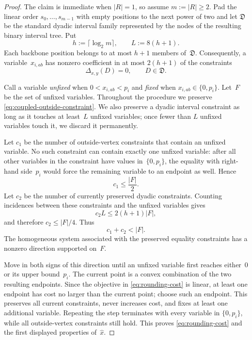 \documentclass[12pt,a4paper,oneside]{report}
\begin{document}
\begin{proof}
The claim is immediate when $|R|=1$, so assume $m:=|R|\ge2$.  Pad the linear
order $s_0,\ldots,s_{m-1}$ with empty positions to the next power of two and
let $\mathfrak D$ be the standard dyadic interval family represented by the
nodes of the resulting binary interval tree.  Put
\[
    h:=\lceil\log_2 m\rceil,
    \qquad
    L:=8(h+1).
\]
Each backbone position belongs to at most $h+1$ members of~$\mathfrak D$.
Consequently, a variable~$x_{i,ab}$ has nonzero coefficient in at most
$2(h+1)$ of the constraints
\[
    \Delta_{x,y}(D)=0,
    \qquad D\in\mathfrak D.
\]

Call a variable \emph{unfixed} when $0<x_{i,ab}<p_i$ and \emph{fixed} when
$x_{i,ab}\in\{0,p_i\}$.  Let~$F$ be the set of unfixed variables.  Throughout
the procedure we preserve
\cref{eq:coupled-outside-constraint}.  We also preserve a dyadic interval
constraint as long as it touches at least~$L$ unfixed variables; once fewer than
$L$ unfixed variables touch it, we discard it permanently.

Let $c_1$ be the number of outside-vertex constraints that contain an unfixed
variable.  No such constraint can contain exactly one unfixed variable: after
all other variables in the constraint have values in~$\{0,p_i\}$, the equality with
right-hand side~$p_i$ would force the remaining variable to an endpoint as
well.  Hence
\[
    c_1\le\frac{|F|}{2}.
\]
Let $c_2$ be the number of currently preserved dyadic constraints.  Counting
incidences between these constraints and the unfixed variables gives
\[
    c_2L
    \le 2(h+1)|F|,
\]
and therefore $c_2\le |F|/4$.  Thus
\[
    c_1+c_2<|F|.
\]
The homogeneous system associated with the preserved equality constraints has a
nonzero direction supported on~$F$.

Move in both signs of this direction until an unfixed variable first reaches
either~$0$ or its upper bound~$p_i$.  The current point is a convex
combination of the two resulting endpoints.  Since the objective in
\cref{eq:rounding-cost} is linear, at least one endpoint has cost no larger
than the current point; choose such an endpoint.  This preserves all current
constraints, never increases cost, and fixes at least one additional variable.
Repeating the step terminates with every variable in
$\{0,p_i\}$, while all outside-vertex constraints still hold.  This proves
\cref{eq:rounding-cost} and the first displayed properties of~$\widehat x$.


\end{proof}
\end{document}
